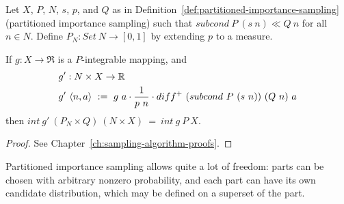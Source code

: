 \begin{theorem}
\label{thm:partitioned-importance-sampling-correctness}
Let $X$, $P$, $N$, $s$, $p$, and $Q$ as in Definition~\ref{def:partitioned-importance-sampling} (partitioned importance sampling) such that $subcond~P~(s~n) \ll Q~n$ for all $n \in N$. Define $P_N : Set~N \to [0,1]$ by extending $p$ to a measure.

If $g : X \to \Re$ is a $P$-integrable mapping, and
\begin{equation}
\begin{aligned}
	&g' : N \times X \to \mathbb{R} \\
	&g'~\langle{n,a}\rangle\ :=\ g~a \cdot \dfrac{1}{p~n} \cdot diff^+~(subcond~P~(s~n))~(Q~n)~a
\end{aligned}
\end{equation}
then $int~g'~(P_N \times Q)~(N \times X)\ =\ int~g~P~X$.
\end{theorem}
\begin{proof}
See Chapter~\ref{ch:sampling-algorithm-proofs}.
\end{proof}

Partitioned importance sampling allows quite a lot of freedom: parts can be chosen with arbitrary nonzero probability, and each part can have its own candidate distribution, which may be defined on a superset of the part.

